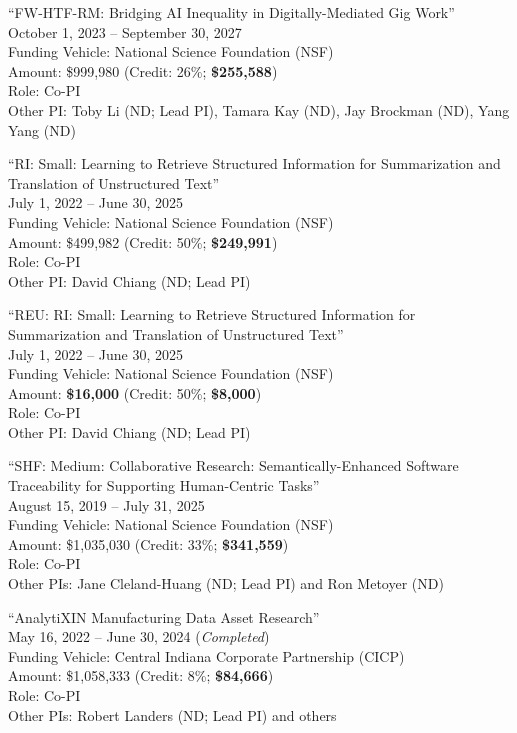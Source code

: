 \documentclass[10pt]{article}
\newenvironment{myindentpar}[1]%
{\begin{list}{}%
         {\setlength{\leftmargin}{#1}}%
         \item[]%
}
{\end{list}}
\newcounter{list}
\begin{document}
\begin{myindentpar}{0.75cm}
\hspace{-0.75cm}``FW-HTF-RM: Bridging AI Inequality in Digitally-Mediated Gig Work'' \\
October 1, 2023 -- September 30, 2027 \\
Funding Vehicle: National Science Foundation (NSF) \\
Amount: \$999,980 (Credit: 26\%; \textbf{\$255,588}) \\
Role: {Co-PI} \\
Other PI: Toby Li (ND; Lead PI), Tamara Kay (ND), Jay Brockman (ND), Yang Yang (ND)

\hspace{-0.75cm}``RI: Small: Learning to Retrieve Structured Information for Summarization and Translation of Unstructured Text'' \\
July 1, 2022 -- June 30, 2025 \\
Funding Vehicle: National Science Foundation (NSF) \\
Amount: \$499,982 (Credit: 50\%; \textbf{\$249,991}) \\
Role: {Co-PI} \\
Other PI: David Chiang (ND; Lead PI)

\hspace{-0.75cm}``REU: RI: Small: Learning to Retrieve Structured Information for Summarization and Translation of Unstructured Text'' \\
July 1, 2022 -- June 30, 2025 \\
Funding Vehicle: National Science Foundation (NSF) \\
Amount: \textbf{\$16,000} (Credit: 50\%; \textbf{\$8,000}) \\
Role: {Co-PI} \\
Other PI: David Chiang (ND; Lead PI)

\hspace{-0.75cm}``SHF: Medium: Collaborative Research: Semantically-Enhanced Software Traceability for Supporting Human-Centric Tasks'' \\
August 15, 2019 -- July 31, 2025 \\
Funding Vehicle: National Science Foundation (NSF) \\
Amount: \$1,035,030 (Credit: 33\%; \textbf{\$341,559}) \\
Role: {Co-PI} \\
Other PIs: Jane Cleland-Huang (ND; Lead PI) and Ron Metoyer (ND)

\hspace{-0.75cm}``AnalytiXIN Manufacturing Data Asset Research'' \\
May 16, 2022 -- June 30, 2024 (\emph{Completed}) \\
Funding Vehicle: Central Indiana Corporate Partnership (CICP) \\
Amount: \$1,058,333 (Credit: 8\%; \textbf{\$84,666}) \\
Role: {Co-PI} \\
Other PIs: Robert Landers (ND; Lead PI) and others


\end{myindentpar}
\end{document}
